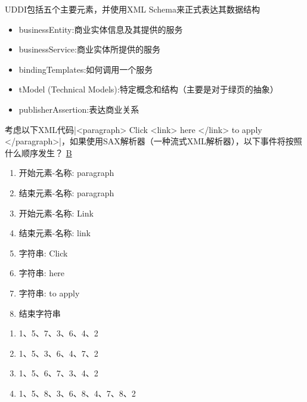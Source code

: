 \begin{solution}
UDDI包括五个主要元素，并使用XML Schema来正式表达其数据结构
\vspace{-0.8em}
\begin{multicols}{2}
    \begin{itemize}
        \item businessEntity:商业实体信息及其提供的服务
        \item businessService:商业实体所提供的服务
        \item bindingTemplates:如何调用一个服务
        \item tModel (Technical Models):特定概念和结构（主要是对于绿页的抽象）
        \item publisherAssertion:表达商业关系
    \end{itemize}
\end{multicols}
\vspace{-1em}
\end{solution}


\begin{problem}
考虑以下XML代码\sverb|<paragraph> Click <link> here </link> to apply </paragraph>|，如果使用SAX解析器（一种流式XML解析器），以下事件将按照什么顺序发生？
\uline{B}
\vspace{-0.8em}
\begin{multicols}{3}
    \begin{enumerate}[label=\arabic*.]
        \item 开始元素-名称: paragraph
        \item 结束元素-名称: paragraph
        \item 开始元素-名称: Link
        \item 结束元素-名称: link
        \item 字符串: Click
        \item 字符串: here
        \item 字符串: to apply
        \item 结束字符串
    \end{enumerate}
\end{multicols}
\vspace{-1em}
\vspace{-0.8em}
\begin{multicols}{2}
    \begin{enumerate}[label=\Alph*.]
        \item 1、5、7、3、6、4、2
        \item 1、5、3、6、4、7、2
        \item 1、5、6、7、3、4、2
        \item 1、5、8、3、6、8、4、7、8、2
    \end{enumerate}
\end{multicols}
\vspace{-1em}
\end{problem}